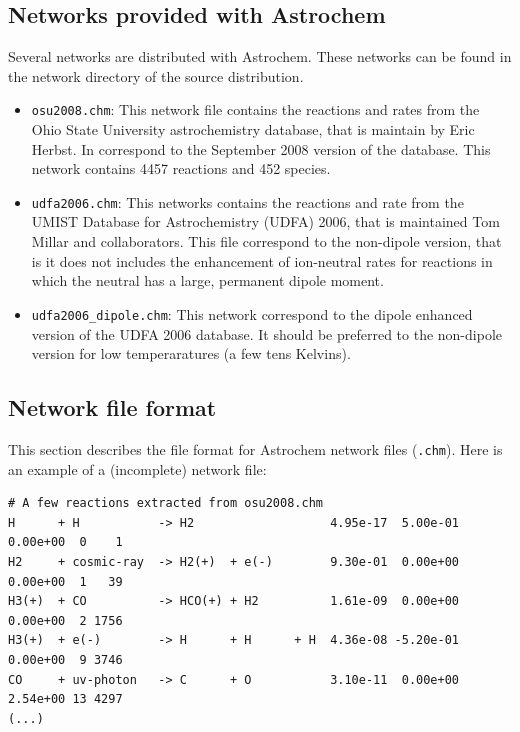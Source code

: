 \documentclass[a4paper,12pt]{article}
\begin{document}
{\subsection{Networks provided with Astrochem}
\label{sec:netw-prov-with}

Several networks are distributed with Astrochem.  These networks can
be found in the network directory of the source distribution.

\begin{itemize}

\item \verb=osu2008.chm=: This network file contains the reactions and
  rates from the Ohio State University astrochemistry database, that
  is maintain by Eric Herbst. In correspond to the September 2008
  version of the database. This network contains 4457 reactions and
  452 species.

\item \verb=udfa2006.chm=: This networks contains the reactions and
  rate from the UMIST Database for Astrochemistry (UDFA) 2006, that is
  maintained Tom Millar and collaborators. This file correspond to the
  non-dipole version, that is it does not includes the enhancement of
  ion-neutral rates for reactions in which the neutral has a large,
  permanent dipole moment.

\item \verb=udfa2006_dipole.chm=: This network correspond to the
  dipole enhanced version of the UDFA 2006 database. It should be
  preferred to the non-dipole version for low temperaratures (a few
  tens Kelvins).

\end{itemize}

\subsection{Network file format}

This section describes the file format for Astrochem network files
(\verb=.chm=). Here is an example of a (incomplete) network file:

\begin{verbatim}
# A few reactions extracted from osu2008.chm
H      + H           -> H2                   4.95e-17  5.00e-01  0.00e+00  0    1
H2     + cosmic-ray  -> H2(+)  + e(-)        9.30e-01  0.00e+00  0.00e+00  1   39
H3(+)  + CO          -> HCO(+) + H2          1.61e-09  0.00e+00  0.00e+00  2 1756
H3(+)  + e(-)        -> H      + H      + H  4.36e-08 -5.20e-01  0.00e+00  9 3746
CO     + uv-photon   -> C      + O           3.10e-11  0.00e+00  2.54e+00 13 4297
(...)
\end{verbatim}

}
\end{document}

